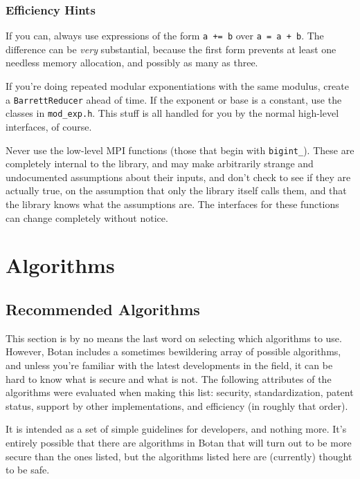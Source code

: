 \documentclass{article}
\newcommand{\filename}[1]{\texttt{#1}}
\newcommand{\type}[1]{\texttt{#1}}
\begin{document}
\subsubsection{Efficiency Hints}

If you can, always use expressions of the form \verb|a += b| over
\verb|a = a + b|. The difference can be \emph{very} substantial, because the
first form prevents at least one needless memory allocation, and possibly as
many as three.

If you're doing repeated modular exponentiations with the same modulus, create
a \type{BarrettReducer} ahead of time. If the exponent or base is a constant,
use the classes in \filename{mod\_exp.h}. This stuff is all handled for you by
the normal high-level interfaces, of course.

Never use the low-level MPI functions (those that begin with
\texttt{bigint\_}). These are completely internal to the library, and
may make arbitrarily strange and undocumented assumptions about their
inputs, and don't check to see if they are actually true, on the
assumption that only the library itself calls them, and that the
library knows what the assumptions are. The interfaces for these
functions can change completely without notice.

\pagebreak
\section{Algorithms}

\subsection{Recommended Algorithms}

This section is by no means the last word on selecting which algorithms to use.
However, Botan includes a sometimes bewildering array of possible algorithms,
and unless you're familiar with the latest developments in the field, it can be
hard to know what is secure and what is not. The following attributes of the
algorithms were evaluated when making this list: security, standardization,
patent status, support by other implementations, and efficiency (in roughly
that order).

It is intended as a set of simple guidelines for developers, and nothing more.
It's entirely possible that there are algorithms in Botan that will turn out to
be more secure than the ones listed, but the algorithms listed here are
(currently) thought to be safe.
\end{document}
